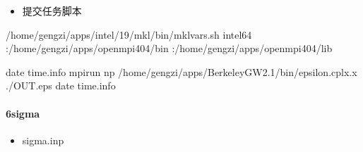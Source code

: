 \documentclass[a4paper,12pt,english]{sphinxmanual}
\begin{document}
\begin{itemize}
\item {} 
\sphinxAtStartPar
提交任务脚本

\end{itemize}

\begin{sphinxVerbatim}[commandchars=\\\{\}]

 
 /home/gengzi/apps/intel/19/mkl/bin/mklvars.sh intel64
 :/home/gengzi/apps/openmpi404/bin
 :/home/gengzi/apps/openmpi404/lib

date  \PYGZgt{}\PYGZgt{} time.info
mpirun \PYGZhy{}np  /home/gengzi/apps/BerkeleyGW\PYGZhy{}2.1/bin/epsilon.cplx.x \PYGZgt{} ./OUT.eps
date  \PYGZgt{}\PYGZgt{} time.info
\end{sphinxVerbatim}


\paragraph{6\sphinxhyphen{}sigma}
\label{\detokenize{tutorials/berkeleygw/gw:sigma}}\begin{itemize}
\item {} 
\sphinxAtStartPar
sigma.inp

\end{itemize}
\end{document}
